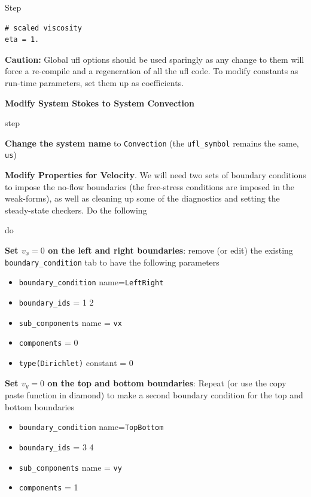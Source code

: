 \begin{steps}{Step}
\begin{itemize}
\begin{lstlisting}[style=UFL]
# scaled viscosity 
eta = 1.
    \end{lstlisting}

  \end{itemize}
\textbf{Caution:} Global ufl options should be used sparingly
  as any change to them will force a re-compile and a regeneration of
  all the ufl code.  To modify constants as run-time parameters, set
  them up as coefficients.
\item \textbf{Modify System Stokes to System Convection}
  \begin{steps}{step}
  \item \textbf{Change the system name} to  \texttt{Convection} (the \texttt{ufl\_symbol}
    remains the same, \texttt{us})
  \item \textbf{Modify Properties for Velocity}.  We will need two
    sets of boundary conditions to impose the no-flow boundaries (the
    free-stress conditions are imposed in the weak-forms), as well as
    cleaning up some of the diagnostics and setting the steady-state
    checkers.  Do the following
         \begin{steps}{do}
      \item \textbf{Set $v_{x}=0$ on the left and right boundaries}: remove (or
        edit) the existing \texttt{boundary\_condition} tab to have
        the following parameters
        \begin{itemize}
        \item \texttt{boundary\_condition} name=\texttt{LeftRight}
        \item \texttt{boundary\_ids} = 1 2
        \item \texttt{sub\_components} name = \texttt{vx}
        \item \texttt{components} = 0
        \item \texttt{type(Dirichlet)} constant = 0
        \end{itemize}
      \item \textbf{Set $v_{y}=0$ on the top and bottom boundaries}: Repeat (or use the copy paste function in diamond) to
        make a second boundary condition for the top and bottom
        boundaries
        \begin{itemize}
        \item \texttt{boundary\_condition} name=\texttt{TopBottom}
        \item \texttt{boundary\_ids} = 3 4
        \item \texttt{sub\_components} name = \texttt{vy}
        \item \texttt{components} = 1

\end{itemize}
\end{steps}
\end{steps}
\end{steps}
